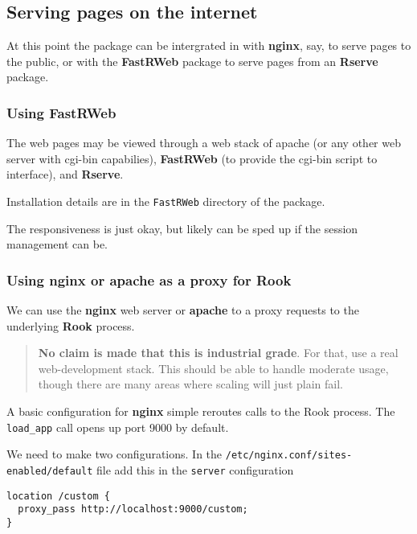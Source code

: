 \documentclass[12pt]{article}
\newcommand{\pkg}[1]{\textbf{#1}}
\newcommand{\code}[1]{\texttt{#1}}
\begin{document}
\subsection{Serving pages on the internet}
\label{sec:serving-pages}


At this point the package can be intergrated in with
\pkg{nginx}, say, to serve pages to the public, or with the
\pkg{FastRWeb} package to serve pages from an \pkg{Rserve} package.

\subsubsection{Using \pkg{FastRWeb}}
\label{sec:using-pkgfastrweb}

The web pages may be viewed through a web stack of apache (or any
other web server with cgi-bin capabilies), \pkg{FastRWeb} (to provide
the cgi-bin script to interface), and \pkg{Rserve}.

Installation details are in the \code{FastRWeb} directory of the package.

The responsiveness is just okay, but likely can be sped up if the
session management can be.


\subsubsection{Using \pkg{nginx} or \pkg{apache} as a proxy for \pkg{Rook}}
\label{sec:using-pkgnginx}

We can use the \pkg{nginx} web
server or \pkg{apache} to a proxy requests to the underlying
\pkg{Rook} process. 
\begin{quotation}
  \textbf{No claim is made that this is industrial grade}. For that,
  use a real web-development stack. This should be able to handle
  moderate usage, though there are many areas where scaling will just
  plain fail.
\end{quotation}


A basic configuration for \pkg{nginx} simple reroutes calls to the
Rook process. The \code{load\_app} call opens up port 9000 by default.


We need to make two configurations. In the
\code{/etc/nginx.conf/sites-enabled/default} file add this in the
\code{server} configuration

\begin{verbatim}
location /custom { 
  proxy_pass http://localhost:9000/custom; 
}
\end{verbatim}
\end{document}
